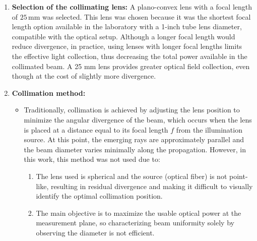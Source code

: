 \begin{enumerate}
    \item \textbf{Selection of the collimating lens:} A plano-convex lens with a focal length of $25$\,mm was selected. This lens was chosen because it was the shortest focal length option available in the laboratory with a 1-inch tube lens diameter, compatible with the optical setup. Although a longer focal length would reduce divergence, in practice, using lenses with longer focal lengths limits the effective light collection, thus decreasing the total power available in the collimated beam. A 25 mm lens provides greater optical field collection, even though at the cost of slightly more divergence.
        
    
    \item \textbf{Collimation method:}
    \begin{itemize}
        \item Traditionally, collimation is achieved by adjusting the lens position to minimize the angular divergence of the beam, which occurs when the lens is placed at a distance equal to its focal length $f$ from the illumination source. At this point, the emerging rays are approximately parallel and the beam diameter varies minimally along the propagation. However, in this work, this method was not used due to:
            \begin{enumerate}
            \item The lens used is spherical and the source (optical fiber) is not point-like, resulting in residual divergence and making it difficult to visually identify the optimal collimation position.
            \item The main objective is to maximize the usable optical power at the measurement plane, so characterizing beam uniformity solely by observing the diameter is not efficient.
            \end{enumerate}


\end{itemize}
\end{enumerate}
